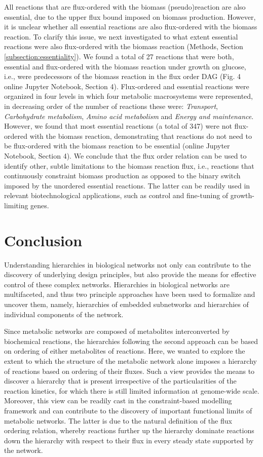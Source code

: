 \documentclass[12pt]{article}
\begin{document}
All reactions that are flux-ordered with the biomass (pseudo)reaction are also essential, due to the upper flux bound imposed on biomass production. However, it is unclear whether all essential reactions are also flux-ordered with the biomass reaction. To clarify this issue, we next investigated to what extent essential reactions were also flux-ordered with the biomass reaction (Methods, Section \ref{subsection:essentiality}). We found a total of 27 reactions that were both, essential and flux-ordered with the biomass reaction under growth on glucose, i.e., were predecessors of the biomass reaction in the flux order DAG (Fig. 4 online Jupyter Notebook, Section 4). Flux-ordered and essential reactions were organized in four levels in which four metabolic macrosystems were represented, in decreasing order of the number of reactions these were: \emph{Transport}, \emph{Carbohydrate metabolism}, \emph{Amino acid metabolism} and \emph{Energy and maintenance}. However, we found that most essential reactions (a total of 347) were not flux-ordered with the biomass reaction, demonstrating that reactions do not need to be flux-ordered with the biomass reaction to be essential (online Jupyter Notebook, Section 4).  We conclude that the flux order relation can be used to identify other, subtle limitations to the biomass reaction flux, i.e., reactions that continuously constraint biomass production as opposed to the binary switch imposed by the unordered essential reactions. The latter can be readily used in relevant biotechnological applications, such as control and fine-tuning of growth-limiting genes.

\section{Conclusion}
Understanding hierarchies in biological networks not only can contribute to the discovery of underlying design principles, but also provide the means for effective control of these complex networks. Hierarchies in biological networks are multifaceted, and thus two principle approaches have been used to formalize and uncover them, namely, hierarchies of embedded subnetworks and hierarchies of individual components of the network.

Since metabolic networks are composed of metabolites interconverted by biochemical reactions, the hierarchies following the second approach can be based on ordering of either metabolites of reactions. Here, we wanted to explore the extent to which the structure of the metabolic network alone imposes a hierarchy of reactions based on ordering of their fluxes. Such a view provides the means to discover a hierarchy that is present irrespective of the particularities of the reaction kinetics, for which there is still limited information at genome-wide scale. Moreover, this view can be readily cast in the constraint-based modelling framework and can contribute to the discovery of important functional limits of metabolic networks. The latter is due to the natural definition of the flux ordering relation, whereby reactions further up the hierarchy dominate reactions down the hierarchy with respect to their flux in every steady state supported by the network.
\end{document}
